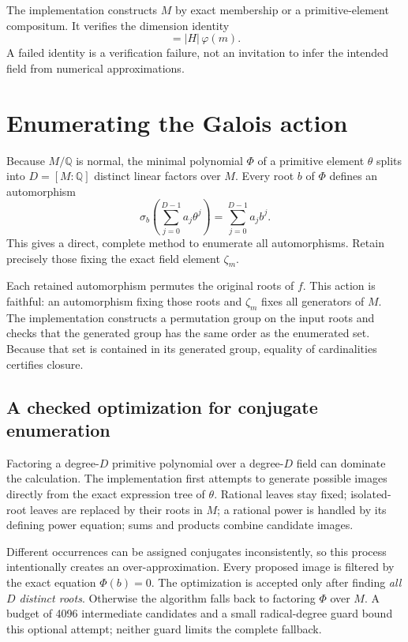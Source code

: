 \documentclass[11pt,a4paper]{article}
\newcommand{\Q}{\mathbb Q}
\theoremstyle{definition}
\theoremstyle{remark}
\begin{document}
The implementation constructs $M$ by exact membership or a primitive-element compositum. It verifies the dimension identity
\begin{equation}
 [M:\Q]=|H|\,\varphi(m).
 \label{eq:dimensioncheck}
\end{equation}
A failed identity is a verification failure, not an invitation to infer the intended field from numerical approximations.

\section{Enumerating the Galois action}

Because $M/\Q$ is normal, the minimal polynomial $\Phi$ of a primitive element $\theta$ splits into $D=[M:\Q]$ distinct linear factors over $M$. Every root $b$ of $\Phi$ defines an automorphism
\begin{equation}
 \sigma_b\left(\sum_{j=0}^{D-1}a_j\theta^j\right)
 =\sum_{j=0}^{D-1}a_jb^j.
 \label{eq:automorphism}
\end{equation}
This gives a direct, complete method to enumerate all automorphisms. Retain precisely those fixing the exact field element $\zeta_m$.

Each retained automorphism permutes the original roots of $f$. This action is faithful: an automorphism fixing those roots and $\zeta_m$ fixes all generators of $M$. The implementation constructs a permutation group on the input roots and checks that the generated group has the same order as the enumerated set. Because that set is contained in its generated group, equality of cardinalities certifies closure.

\subsection{A checked optimization for conjugate enumeration}

Factoring a degree-$D$ primitive polynomial over a degree-$D$ field can dominate the calculation. The implementation first attempts to generate possible images directly from the exact expression tree of $\theta$. Rational leaves stay fixed; isolated-root leaves are replaced by their roots in $M$; a rational power is handled by its defining power equation; sums and products combine candidate images.

Different occurrences can be assigned conjugates inconsistently, so this process intentionally creates an over-approximation. Every proposed image is filtered by the exact equation $\Phi(b)=0$. The optimization is accepted only after finding \emph{all $D$ distinct roots}. Otherwise the algorithm falls back to factoring $\Phi$ over $M$. A budget of 4096 intermediate candidates and a small radical-degree guard bound this optional attempt; neither guard limits the complete fallback.
\end{document}
